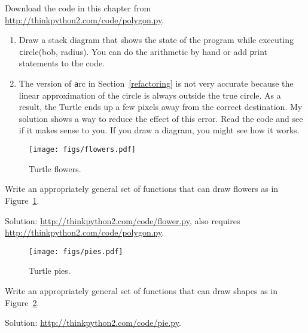 \documentclass[
DIV=11,
fontsize=13,
twoside,
headinclude=false,
titlepage=firstiscover,
abstract=true,
headsepline=true,
footsepline=true,
chapterprefix=true, %
headings=big,
bibliography=totoc,%
captions=tableheading
]{scrbook}
\theoremstyle{definition}
\begin{document}
\begin{exercise}
\normalfont

Download the code in this chapter from
\url{http://thinkpython2.com/code/polygon.py}.

\begin{enumerate}

\item Draw a stack diagram that shows the state of the program
while executing {\texttt circle(bob, radius)}.  You can do the
arithmetic by hand or add {\texttt print} statements to the code.

\item The version of {\texttt arc} in Section~\ref{refactoring} is not
very accurate because the linear approximation of the
circle is always outside the true circle.  As a result,
the Turtle ends up a few pixels away from the correct
destination.  My solution shows a way to reduce
the effect of this error.  Read the code and see if it makes
sense to you.  If you draw a diagram, you might see how it works.

\end{enumerate}

\end{exercise}

\begin{figure}
\centerline
{\texttt{[image: figs/flowers.pdf]}}
\caption{Turtle flowers.}
\label{fig.flowers}
\end{figure}

\begin{exercise}
\normalfont
{}

Write an appropriately general set of functions that
can draw flowers as in Figure~\ref{fig.flowers}.

Solution: \url{http://thinkpython2.com/code/flower.py},
also requires \url{http://thinkpython2.com/code/polygon.py}.

\end{exercise}

\begin{figure}
\centerline
{\texttt{[image: figs/pies.pdf]}}
\caption{Turtle pies.}
\label{fig.pies}
\end{figure}


\begin{exercise}
\normalfont
{}

Write an appropriately general set of functions that
can draw shapes as in Figure~\ref{fig.pies}.

Solution: \url{http://thinkpython2.com/code/pie.py}.

\end{exercise}
\end{document}

